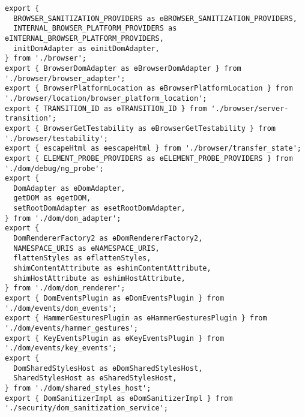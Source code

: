 \begin{verbatim}
export {
  BROWSER_SANITIZATION_PROVIDERS as ɵBROWSER_SANITIZATION_PROVIDERS,
  INTERNAL_BROWSER_PLATFORM_PROVIDERS as ɵINTERNAL_BROWSER_PLATFORM_PROVIDERS,
  initDomAdapter as ɵinitDomAdapter,
} from './browser';
export { BrowserDomAdapter as ɵBrowserDomAdapter } from './browser/browser_adapter';
export { BrowserPlatformLocation as ɵBrowserPlatformLocation } from './browser/location/browser_platform_location';
export { TRANSITION_ID as ɵTRANSITION_ID } from './browser/server-transition';
export { BrowserGetTestability as ɵBrowserGetTestability } from './browser/testability';
export { escapeHtml as ɵescapeHtml } from './browser/transfer_state';
export { ELEMENT_PROBE_PROVIDERS as ɵELEMENT_PROBE_PROVIDERS } from './dom/debug/ng_probe';
export {
  DomAdapter as ɵDomAdapter,
  getDOM as ɵgetDOM,
  setRootDomAdapter as ɵsetRootDomAdapter,
} from './dom/dom_adapter';
export {
  DomRendererFactory2 as ɵDomRendererFactory2,
  NAMESPACE_URIS as ɵNAMESPACE_URIS,
  flattenStyles as ɵflattenStyles,
  shimContentAttribute as ɵshimContentAttribute,
  shimHostAttribute as ɵshimHostAttribute,
} from './dom/dom_renderer';
export { DomEventsPlugin as ɵDomEventsPlugin } from './dom/events/dom_events';
export { HammerGesturesPlugin as ɵHammerGesturesPlugin } from './dom/events/hammer_gestures';
export { KeyEventsPlugin as ɵKeyEventsPlugin } from './dom/events/key_events';
export {
  DomSharedStylesHost as ɵDomSharedStylesHost,
  SharedStylesHost as ɵSharedStylesHost,
} from './dom/shared_styles_host';
export { DomSanitizerImpl as ɵDomSanitizerImpl } from './security/dom_sanitization_service';
\end{verbatim}
